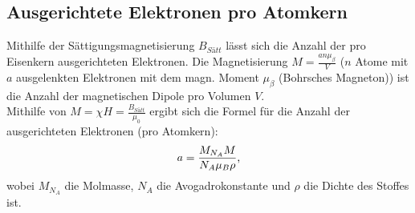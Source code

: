 \begin{figure}[!htbp]
\hfill
{}
 \label{weiss}
\end{figure}

\subsection{Ausgerichtete Elektronen pro Atomkern}
Mithilfe der Sättigungsmagnetisierung $B_{Sätt}$ lässt sich die Anzahl der pro Eisenkern ausgerichteten Elektronen. Die Magnetisierung $M=\frac{an\mu_\beta}{V}$ ($n$ Atome mit $a$ ausgelenkten Elektronen mit dem magn. Moment $\mu_\beta$ (Bohrsches Magneton)) ist die Anzahl der magnetischen Dipole pro Volumen $V$.\\
Mithilfe von $M=\chi H=\frac{B_{Sätt}}{\mu_0}$ ergibt sich die Formel für die Anzahl der ausgerichteten Elektronen (pro Atomkern):
\begin{align}
a=\frac{M_{N_A} M}{N_A\mu_B\rho}\text, \label{aepa}
\end{align}
wobei $M_{N_A}$ die Molmasse, $N_A$ die Avogadrokonstante und $\rho$ die Dichte des Stoffes ist.